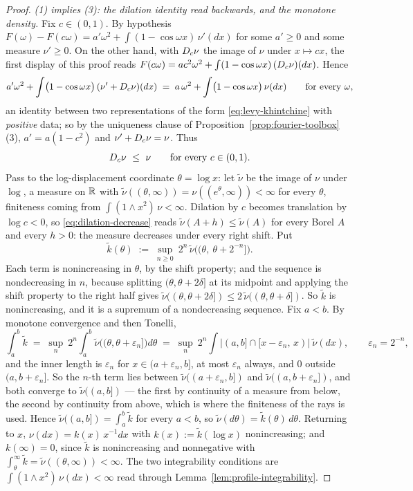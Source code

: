 \begin{proof}
\emph{(1) implies (3): the dilation identity read backwards, and the monotone density.} Fix
$c \in (0,1)$. By hypothesis $F(\omega) - F(c\omega) = a'\omega^2 + \int (1-\cos\omega
x)\,\nu'(dx)$ for some $a' \ge 0$ and some \Levy{} measure $\nu' \ge 0$. On the other hand, with
$D_{c}\nu$ the image of $\nu$ under $x \mapsto cx$, the first display of this proof reads
$F(c\omega) = ac^2\omega^2 + \int (1-\cos\omega x)\,(D_{c}\nu)(dx)$. Hence
\[
  a'\omega^2 + \int \bigl(1 - \cos\omega x\bigr)\,(\nu' + D_{c}\nu)(dx)
  \;=\; a\,\omega^2 + \int \bigl(1 - \cos\omega x\bigr)\,\nu(dx)
  \qquad \text{for every } \omega,
\]
an identity between two representations of the form \ref{eq:levy-khintchine} with
\emph{positive} data; so by the uniqueness clause of Proposition~\ref{prop:fourier-toolbox}(3),
$a' = a(1-c^2)$ and $\nu' + D_{c}\nu = \nu$. Thus
\begin{equation}\label{eq:dilation-decrease}
  D_{c}\nu \ \le\ \nu \qquad \text{for every } c \in (0,1).
\end{equation}
Pass to the log-displacement coordinate $\theta = \log x$: let $\tilde\nu$ be the image of
$\nu$ under $\log$, a measure on $\mathbb{R}$ with
$\tilde\nu((\theta,\infty)) = \nu((e^\theta,\infty)) < \infty$ for every $\theta$, finiteness
coming from $\int (1 \wedge x^2)\,\nu < \infty$. Dilation by $c$ becomes translation by
$\log c < 0$, so \ref{eq:dilation-decrease} reads $\tilde\nu(A + h) \le \tilde\nu(A)$ for every
Borel $A$ and every $h > 0$: the measure decreases under every right shift. Put
\[
  \tilde k(\theta) \;:=\; \sup_{n \ge 0}\ 2^n\,\tilde\nu\bigl((\theta,\ \theta + 2^{-n}]\bigr).
\]
Each term is nonincreasing in $\theta$, by the shift property; and the sequence is nondecreasing
in $n$, because splitting $(\theta, \theta+2\delta]$ at its midpoint and applying the shift
property to the right half gives
$\tilde\nu((\theta,\theta+2\delta]) \le 2\,\tilde\nu((\theta,\theta+\delta])$. So $\tilde k$ is
nonincreasing, and it is a supremum of a nondecreasing sequence. Fix $a < b$. By monotone
convergence and then Tonelli,
\[
  \int_a^b \tilde k \;=\; \sup_n\ 2^n\!\int_a^b \tilde\nu\bigl((\theta,\theta+\varepsilon_n]\bigr)
    d\theta
  \;=\; \sup_n\ 2^n\!\int \bigl|(a,b] \cap [x - \varepsilon_n,\, x)\bigr|\ \tilde\nu(dx),
  \qquad \varepsilon_n = 2^{-n},
\]
and the inner length is $\varepsilon_n$ for $x \in (a+\varepsilon_n, b]$, at most
$\varepsilon_n$ always, and $0$ outside $(a, b+\varepsilon_n]$. So the $n$-th term lies between
$\tilde\nu((a+\varepsilon_n, b])$ and $\tilde\nu((a, b+\varepsilon_n])$, and both converge to
$\tilde\nu((a,b])$ --- the first by continuity of a measure from below, the second by continuity
from above, which is where the finiteness of the rays is used. Hence
$\tilde\nu((a,b]) = \int_a^b \tilde k$ for every $a < b$, so $\tilde\nu(d\theta) =
\tilde k(\theta)\,d\theta$. Returning to $x$, $\nu(dx) = k(x)\,x^{-1}dx$ with
$k(x) := \tilde k(\log x)$ nonincreasing; and $k(\infty) = 0$, since $\tilde k$ is nonincreasing
and nonnegative with $\int_\theta^\infty \tilde k = \tilde\nu((\theta,\infty)) < \infty$. The two
integrability conditions are $\int (1 \wedge x^2)\,\nu(dx) < \infty$ read through
Lemma~\ref{lem:profile-integrability}.


\end{proof}
